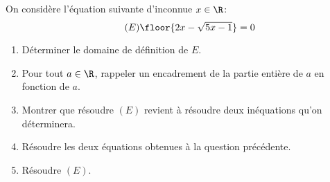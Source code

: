 
\begin{exercice}[Problème]
On considère l'équation suivante d'inconnue $x\in \R$:
\begin{equation}\tag{$E$}
\floor{2x - \sqrt{5x-1}}=0
\end{equation}
\begin{enumerate}
\item Déterminer le domaine de définition de $E$.
\item  Pour tout $a\in \R$, rappeler un encadrement de la partie entière  de $a$ en fonction de $a$. 
\item Montrer que résoudre $(E)$ revient à résoudre deux inéquations qu'on déterminera. 
\item Résoudre les deux équations obtenues à la question précédente. 
\item Résoudre $(E)$. 
\end{enumerate}
\end{exercice}